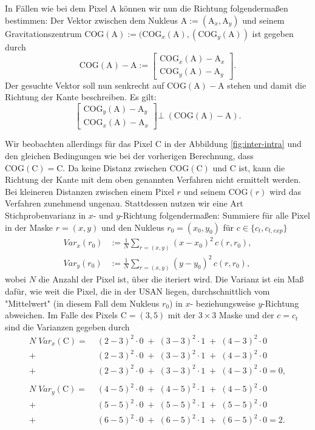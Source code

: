 \documentclass[a4paper, 11pt]{report}
\theoremstyle{definition}
\begin{document}
			In Fällen wie bei dem Pixel A können wir nun die Richtung folgendermaßen bestimmen: Der Vektor zwischen dem Nukleus $\text{A} := (\text{A}_x, \text{A}_y)$ und seinem Gravitationszentrum $\text{COG}(\text{A}) := (\text{COG}_x(\text{A}), (\text{COG}_y(\text{A}))$ ist gegeben durch $$\text{COG}(\text{A}) - \text{A} := \begin{bmatrix}\text{COG}_x(\text{A}) - \text{A}_x \\ \text{COG}_y(\text{A}) - \text{A}_y\end{bmatrix}.$$
			Der gesuchte Vektor soll nun senkrecht auf $\text{COG}(\text{A}) - \text{A}$ stehen und damit die Richtung der Kante beschreiben. Es gilt:
			$$\begin{bmatrix}\text{COG}_y(\text{A}) - \text{A}_y \\ \text{COG}_x(\text{A}) - \text{A}_x\end{bmatrix} \bot \; \left(\text{COG}(\text{A}) - \text{A}\right).$$

			Wir beobachten allerdings für das Pixel C in der Abbildung \ref{fig:inter-intra} und den gleichen Bedingungen wie bei der vorherigen Berechnung, dass $\text{COG}(\text{C}) = \text{C}$. Da keine Distanz zwischen $\text{COG}(\text{C})$ und C ist, kann die Richtung der Kante mit dem oben genannten Verfahren nicht ermittelt werden. Bei kleineren Distanzen zwischen einem Pixel $r$ und seinem $\text{COG}(r)$ wird das Verfahren zunehmend ungenau. Stattdessen nutzen wir eine Art Stichprobenvarianz in $x$- und $y$-Richtung folgendermaßen: Summiere für alle Pixel in der Maske $r = (x, y)$ und den Nukleus $r_0 = (x_0, y_0)$ für $c \in \{c_t, c_{t,exp}\}$
			\begin{align*}
				Var_{x}(r_0) &:= \frac{1}{N}\sum_{r=(x,y)} (x-x_0)^2 \, c(r,r_0), \\
				Var_{y}(r_0) &:= \frac{1}{N}\sum_{r=(x,y)} (y-y_0)^2 \, c(r,r_0),
 			\end{align*}
 			wobei $N$ die Anzahl der Pixel ist, über die iteriert wird.
 			Die Varianz ist ein Maß dafür, wie weit die Pixel, die in der USAN liegen, durchschnittlich vom "Mittelwert" (in diesem Fall dem Nukleus $r_0$) in $x$- beziehungsweise $y$-Richtung abweichen. Im Falle des Pixels $\text{C} = (3,5)$ mit der $3\times3$ Maske und der $c = c_t$ sind die Varianzen gegeben durch
 			\begin{align*}
 				N \; Var_x(\text{C}) 	=\; &(2-3)^2 \cdot 0 \;+\; (3-3)^2 \cdot 1 \;+\; (4-3)^2 \cdot 0  \\
 										+\; &(2-3)^2 \cdot 0 \;+\; (3-3)^2 \cdot 1 \;+\; (4-3)^2 \cdot 0  \\
 										+\; &(2-3)^2 \cdot 0 \;+\; (3-3)^2 \cdot 1 \;+\; (4-3)^2 \cdot 0  = 0, \\
 										\\
 				N \; Var_y(\text{C}) 	=\; &(4-5)^2 \cdot 0 \;+\; (4-5)^2 \cdot 1 \;+\; (4-5)^2 \cdot 0  \\
 										+\; &(5-5)^2 \cdot 0 \;+\; (5-5)^2 \cdot 1 \;+\; (5-5)^2 \cdot 0  \\
 										+\; &(6-5)^2 \cdot 0 \;+\; (6-5)^2 \cdot 1 \;+\; (6-5)^2 \cdot 0  = 2. \\& 
 			\end{align*}
 			
\end{document}

